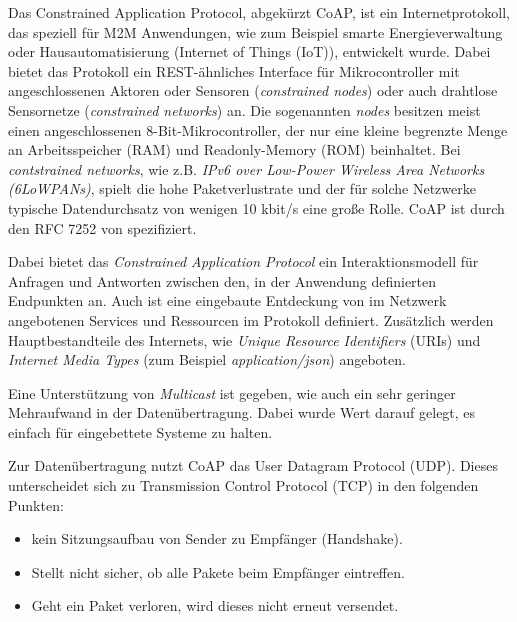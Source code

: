 Das Constrained Application Protocol, abgekürzt CoAP, ist ein Internetprotokoll, das speziell für M2M Anwendungen, wie zum Beispiel smarte Energieverwaltung oder Hausautomatisierung (Internet of Things (IoT)), entwickelt wurde. Dabei bietet das Protokoll ein REST-ähnliches Interface für Mikrocontroller mit angeschlossenen Aktoren oder Sensoren (\textit{constrained nodes}) oder auch drahtlose Sensornetze (\textit{constrained networks}) an. Die sogenannten \textit{nodes} besitzen meist einen angeschlossenen 8-Bit-Mikrocontroller, der nur eine kleine begrenzte Menge an Arbeitsspeicher (RAM) und Readonly-Memory (ROM) beinhaltet. Bei \textit{contstrained networks}, wie z.B. \textit{IPv6 over Low-Power Wireless Area Networks (6LoWPANs)}, spielt die hohe Paketverlustrate und der für solche Netzwerke typische Datendurchsatz von wenigen 10 kbit/s eine große Rolle. CoAP ist durch den RFC 7252 von \citeauthor{RFC7252} \cite{RFC7252} spezifiziert.

Dabei bietet das \textit{Constrained Application Protocol} ein Interaktionsmodell für Anfragen und Antworten zwischen den, in der Anwendung definierten Endpunkten an. Auch ist eine eingebaute Entdeckung von im Netzwerk angebotenen Services und Ressourcen im Protokoll definiert. Zusätzlich werden Hauptbestandteile des Internets, wie \textit{Unique Resource Identifiers} (URIs) und \textit{Internet Media Types} (zum Beispiel \textit{application/json}) angeboten.

Eine Unterstützung von \textit{Multicast} ist gegeben, wie auch ein sehr geringer Mehraufwand in der Datenübertragung. Dabei wurde Wert darauf gelegt, es einfach für eingebettete Systeme zu halten.

Zur Datenübertragung nutzt CoAP das User Datagram Protocol (UDP). Dieses unterscheidet sich zu Transmission Control Protocol (TCP) in den folgenden Punkten:
\begin{itemize}
    \item kein Sitzungsaufbau von Sender zu Empfänger (Handshake).
    \item Stellt nicht sicher, ob alle Pakete beim Empfänger eintreffen.
    \item Geht ein Paket verloren, wird dieses nicht erneut versendet.
\end{itemize}


